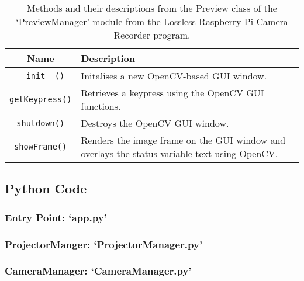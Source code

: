 \begin{table}[H]
    \centering
    \begin{tabularx}{\linewidth}{c | X}
        Name    &   Description\\
        \hline
        \hline
        \texttt{\_\_init\_\_()}     &   Initalises a new OpenCV-based GUI window.\\
        \hline
        \texttt{getKeypress()}     &   Retrieves a keypress using the OpenCV GUI functions.\\
        \hline
        \texttt{shutdown()}     &   Destroys the OpenCV GUI window.\\
        \hline
        \texttt{showFrame()}     &   Renders the image frame on the GUI window and overlays the status variable text using OpenCV.\\
        \hline
    \end{tabularx}
    \caption{Methods and their descriptions from the Preview class of the `PreviewManager' module from the Lossless Raspberry Pi Camera Recorder program.}
    \label{table:previewmanagerclassfuncs}
\end{table}


\subsection{Python Code}
\label{rec_code}
\subsubsection{Entry Point: `app.py'}




\subsubsection{ProjectorManger: `ProjectorManager.py'}




\subsubsection{CameraManager: `CameraManager.py'}

